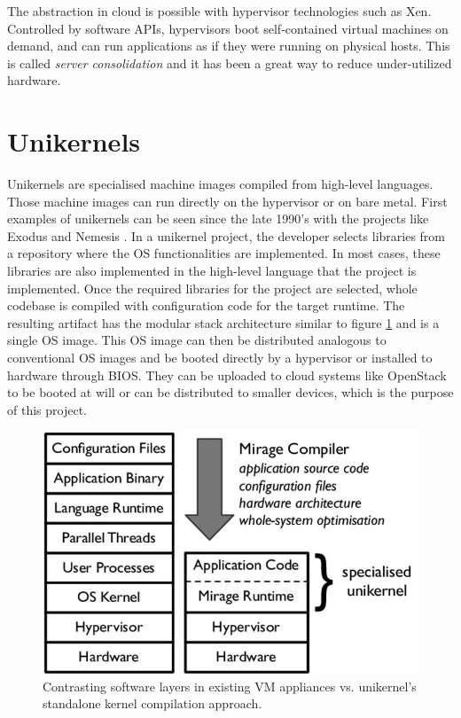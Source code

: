 The abstraction in cloud is possible with hypervisor technologies such as Xen. Controlled by software APIs, hypervisors boot self-contained virtual machines on demand, and can run applications as if they were running on physical hosts. This is called \textit{server consolidation} and it has been a great way to reduce under-utilized hardware.

\section{Unikernels}
Unikernels \cite{library-operating-system} \cite{madhavapeddy2014unikernels} are specialised machine images compiled from high-level languages. Those machine images can run directly on the hypervisor or on bare metal. First examples of unikernels can be seen since the late 1990's with the projects like Exodus\cite{exokernel} and Nemesis \cite{nemesis}. In a unikernel project, the developer selects libraries from a repository where the OS functionalities are implemented. In most cases, these libraries are also implemented in the high-level language that the project is implemented. Once the required libraries for the project are selected, whole codebase is compiled with configuration code for the target runtime. The resulting artifact has the modular stack architecture similar to figure \ref{fig:unikernel-arch} and is a single OS image. This OS image can then be distributed analogous to conventional OS images and be booted directly by a hypervisor or installed to hardware through BIOS. They can be uploaded to cloud systems like OpenStack \cite{openstack} to be booted at will or can be distributed to smaller devices, which is the purpose of this project.

\begin{figure}[htpb]
  \centering
  \includegraphics[height=0.3\textwidth]{figures/Contrasting-software-layers-in-existing-VM-appliances-vs-unikernels-standalone-kernel_W640.jpg}
  \caption{ Contrasting software layers in existing VM appliances vs. unikernel’s standalone kernel compilation approach. \cite{library-operating-system}} \label{fig:unikernel-arch}
\end{figure}

